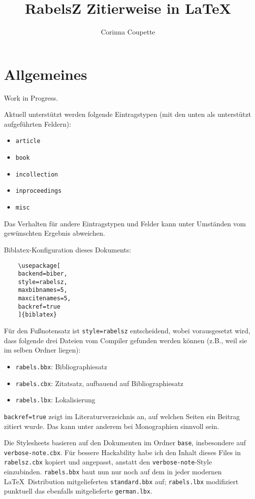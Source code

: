 \documentclass[a4paper]{article}
\title{RabelsZ Zitierweise in \LaTeX}
\author{Corinna Coupette}
\date{}
\begin{document}
\maketitle

\section{Allgemeines}

Work in Progress.

Aktuell unterstützt werden folgende Eintragstypen (mit den unten als unterstützt aufgeführten Feldern):
\begin{itemize}[label=--,itemsep=0em]
	\item \texttt{article}
	\item \texttt{book}
	\item \texttt{incollection}
	\item \texttt{inproceedings}
	\item \texttt{misc}
\end{itemize}
Das Verhalten für andere Eintragstypen und Felder kann unter Umständen vom gewünschten Ergebnis abweichen.

Biblatex-Konfiguration dieses Dokuments:

\begin{Verbatim}
	\usepackage[
	backend=biber,
	style=rabelsz,
	maxbibnames=5,
	maxcitenames=5,
	backref=true
	]{biblatex}
\end{Verbatim}

Für den Fußnotensatz ist \texttt{style=rabelsz} entscheidend, wobei vorausgesetzt wird, dass folgende drei Dateien vom Compiler gefunden werden können (z.B., weil sie im selben Ordner liegen):
\begin{itemize}[label=--,itemsep=0em]
	\item \texttt{rabels.bbx}: Bibliographiesatz
	\item \texttt{rabels.cbx}: Zitatsatz, aufbauend auf Bibliographiesatz
	\item \texttt{rabels.lbx}: Lokalisierung 
\end{itemize}

\texttt{backref=true} zeigt im Literaturverzeichnis an, auf welchen Seiten ein Beitrag zitiert wurde. 
Das kann unter anderem bei Monographien sinnvoll sein.

Die Stylesheets basieren auf den Dokumenten im Ordner \texttt{base}, insbesondere auf  \texttt{verbose-note.cbx}.
Für bessere Hackability habe ich den Inhalt dieses Files in \texttt{rabelsz.cbx} kopiert und angepasst, anstatt den \texttt{verbose-note}-Style einzubinden.
\texttt{rabels.bbx} baut nun nur noch auf dem in jeder modernen \LaTeX\ Distribution mitgelieferten \texttt{standard.bbx} auf; \texttt{rabels.lbx} modifiziert punktuell das ebenfalls mitgelieferte \texttt{german.lbx}.
\end{document}
